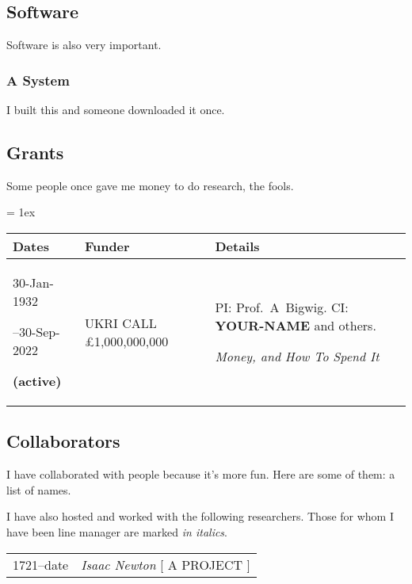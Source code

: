 \subsection{Software}

Software is also very important.

\subsubsection{A System}
I built this and someone downloaded it once.

\subsection{Grants}

Some people once gave me money to do research, the fools.

{
  \everyrow{\tabucline-}
  \tabulinesep = 1ex

  \begin{longtabu} to \textwidth{
      X[1.1,l]
      X[1.2,l]
      X[4,l]
    }

    \bf Dates
    & \bf Funder
    & \bf Details
    \\
    \endhead

    30-Jan-1932\par\hfill--30-Sep-2022\par\bf\small (active)
    & UKRI CALL £1,000,000,000
    & PI: Prof.~A~Bigwig. CI: {\bf YOUR-NAME} and others.
    \par\em Money, and How To Spend It
    \\

  \end{longtabu}
}

\subsection{Collaborators}

I have collaborated with people because it's more fun. Here are some of them: a list of names.

I have also hosted and worked with the following researchers. Those for whom I have been line manager are marked \emph{in italics}.

\begin{tabular}{L!{\VRule}R}
  1721--date & \emph{Isaac Newton} [ A PROJECT ]\\
\end{tabular}

